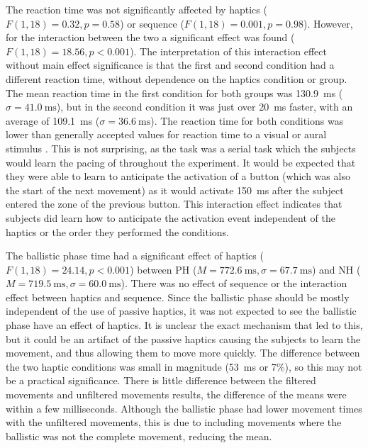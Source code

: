 The reaction time was not significantly affected by haptics ($F(1,18)=0.32, p=0.58$) or sequence ($F(1,18)=0.001, p=0.98$).
However, for the interaction between the two a significant effect was found ($F(1,18)=18.56, p<0.001$).
The interpretation of this interaction effect without main effect significance is that the first and second condition had a different reaction time, without dependence on the haptics condition or group.
The mean reaction time in the first condition for both groups was \SI{130.9}{\milli\second} ($\sigma=\SI{41.0}{\milli\second}$), but in the second condition it was just over \SI{20}{\milli\second} faster, with an average of \SI{109.1}{\milli\second} ($\sigma=\SI{36.6}{\milli\second}$).
The reaction time for both conditions was lower than generally accepted values for reaction time to a visual or aural stimulus \citep{teichner_recent_1954}.
This is not surprising, as the task was a serial task which the subjects would learn the pacing of throughout the experiment.
It would be expected that they were able to learn to anticipate the activation of a button (which was also the start of the next movement) as it would activate \SI{150}{\milli\second} after the subject entered the zone of the previous button.
This interaction effect indicates that subjects did learn how to anticipate the activation event independent of the haptics or the order they performed the conditions.

The ballistic phase time had a significant effect of haptics ($F(1, 18)=24.14, p<0.001$) between PH ($M=\SI{772.6}{\milli\second}, \sigma=\SI{67.7}{\milli\second}$) and NH ($M=\SI{719.5}{\milli\second}, \sigma=\SI{60.0}{\milli\second}$).
There was no effect of sequence or the interaction effect between haptics and sequence.
Since the ballistic phase should be mostly independent of the use of passive haptics, it was not expected to see the ballistic phase have an effect of haptics.
It is unclear the exact mechanism that led to this, but it could be an artifact of the passive haptics causing the subjects to learn the movement, and thus allowing them to move more quickly.
The difference between the two haptic conditions was small in magnitude (\SI{53}{\milli\second} or 7\%), so this may not be a practical significance.
There is little difference between the filtered movements and unfiltered movements results, the difference of the means were within a few milliseconds.
Although the ballistic phase had lower movement times with the unfiltered movements, this is due to including movements where the ballistic was not the complete movement, reducing the mean.

